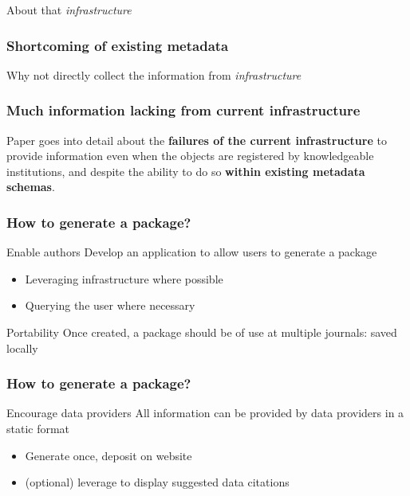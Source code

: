 \begin{frame}
\huge About that \textit{\color{MidnightBlue} infrastructure} \textellipsis
\end{frame}


\begin{frame}
\frametitle{Shortcoming of existing metadata}
\begin{block}{Why not directly collect the information from \textit{\color{MidnightBlue} infrastructure}}
	
\end{block}
\end{frame}

\begin{frame}
\frametitle{Much information lacking from current infrastructure}
Paper goes into detail about the \textbf{failures of the current infrastructure} to provide information even when the objects are registered by knowledgeable institutions, and despite the ability to do so \textbf{within existing metadata schemas}.
\end{frame}



\begin{frame}
\frametitle{How to generate a \metajelo package?}
\begin{block}{Enable authors}
 Develop an application to allow users to generate a \metajelo package
 \begin{itemize}
 	\item Leveraging infrastructure where possible
 	\item Querying the user where necessary
 \end{itemize}
\end{block}
\begin{block}{Portability}
	Once created, a \metajelo package should be of use at multiple journals: saved locally
\end{block}
\end{frame}

\begin{frame}
\frametitle{How to generate a \metajelo package?}
\begin{block}{Encourage data providers}
	All information can be provided by data providers in a static format
	\begin{itemize}
		\item Generate once, deposit on website
		\item (optional) leverage to display suggested data citations
	\end{itemize}
\end{block}
\end{frame}



